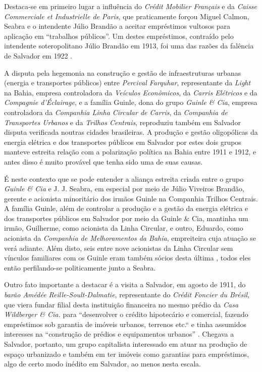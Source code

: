 Destaca-se em primeiro lugar a influência do \textit{Crédit Mobilier Français} e da \textit{Caisse Commerciale et Industrielle de Paris}, que praticamente forçou Miguel Calmon, Seabra e o intendente Júlio Brandão a aceitar empréstimos vultosos para aplicação em ``trabalhos públicos''. Um destes empréstimos, contraído pelo intendente soteropolitano Júlio Brandão em 1913, foi uma das razões da falência de Salvador em 1922 \cite[pp.~119-122,~291]{CUNHA2011}. 

A disputa pela hegemonia na construção e gestão de infraestruturas urbanas (energia e transportes públicos) entre \textit{Percival Farquhar}, representante da \textit{Light} na Bahia, empresa controladora da \textit{Veículos Econômicos}, da \textit{Carris Elétricos} e da \textit{Compagnie d'Éclairage}, e a família Guinle, dona do grupo \textit{Guinle \& Cia}, empresa controladora da \textit{Companhia Linha Circular de Carris}, da \textit{Companhia de Transportes Urbanos} e da \textit{Trilhos Centrais}, reproduziu também em Salvador disputa verificada noutras cidades brasileiras. A produção e gestão oligopólicas da energia elétrica e dos transportes públicos em Salvador por estes dois grupos manteve estreita relação com a polarização política na Bahia entre 1911 e 1912, e antes disso é muito provável que tenha sido uma de suas causas.

É neste contexto que se pode entender a aliança estreita criada entre o grupo \textit{Guinle \& Cia} e J. J. Seabra, em especial por meio de Júlio Viveiros Brandão, gerente e acionista minoritário dos irmãos Guinle na Companhia Trilhos Centrais. A família Guinle, além de controlar a produção e a gestão da energia elétrica e dos transportes públicos em Salvador por meio da Guinle \& Cia, mantinha um irmão, Guilherme, como acionista da Linha Circular, e outro, Eduardo, como acionista da \textit{Companhia de Melhoramentos da Bahia}, empreiteira cuja atuação se verá adiante. Além disto, seis entre nove acionistas da Linha Circular sem vínculos familiares com os Guinle eram também sócios desta última \cite[pp.~122]{CUNHA2011}, todos eles então perfilando-se politicamente junto a Seabra.

Outro fato importante a destacar é a visita a Salvador, em agosto de 1911, do \textit{barão Amédée Reille-Soult-Dalmatie}, representante do \textit{Crédit Foncier du Brésil}, que viera fundar filial desta instituição financeira no mesmo prédio da \textit{Casa Wildberger \& Cia.} para ``desenvolver o crédito hipotecário e comercial, fazendo empréstimos sob garantia de imóveis urbanos, terrenos etc.`` e tinha assumidos interesses na ``construção de prédios e equipamentos urbanos'' \cite[pp.~115-116]{CUNHA2011}. Chegava a Salvador, portanto, um grupo capitalista interessado em atuar na produção de espaço urbanizado e também em ter imóveis como garantias para empréstimos, algo de certo modo inédito em Salvador, ao menos nesta escala.

